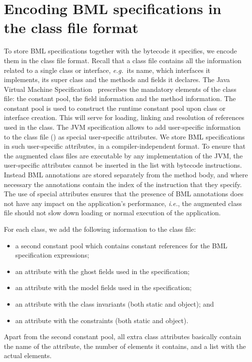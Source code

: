 \section{Encoding BML specifications in the class file format}
\label{SecClassfile}

To store BML specifications together with the bytecode it specifies,
we encode them in the class file format. Recall that a class file
contains all the information related to a single class or interface,
\emph{e.g.}\ its name, which interfaces it implements, its
super class and the methods and fields it declares. The Java Virtual
Machine Specification~\cite{JVMspec} prescribes the mandatory elements
of the class file: the constant pool, the field information and the
method information. The constant pool is used to construct the runtime
constant pool upon class or interface creation. This will serve for
loading, linking and resolution of references used in the class. The
JVM specification allows to add user-specific information to the class
file (\cite[\S4.7.1]{JVMspec}) as special user-specific attributes.
We store BML specifications in such user-specific attributes, in a
compiler-independent format. To ensure that the augmented class files
are executable by any implementation of the JVM, the user-specific
attributes cannot be inserted in the list with bytecode
instructions. Instead BML annotations are stored separately from the
method body, and where necessary the annotations contain the index of
the instruction that they specify. The use of special attributes
ensures that the presence of BML annotations does not have any impact
on the application's performance, \emph{i.e.}, the augmented class
file should not slow down loading or normal execution of the
application. %


For each class, we add the following information to the class file:
\begin{itemize}
\item a second constant pool which contains constant references
      for the BML specification expressions;
\item an attribute with the ghost fields used in the specification;
\item an attribute with the model fields used in the specification;
\item an attribute with the class invariants (both static and object); and
\item an attribute with the constraints (both static and object).
\end{itemize}
Apart from the second constant pool, all extra class attributes
basically contain the name of the attribute, the number of elements it
contains, and a list with the actual elements.


